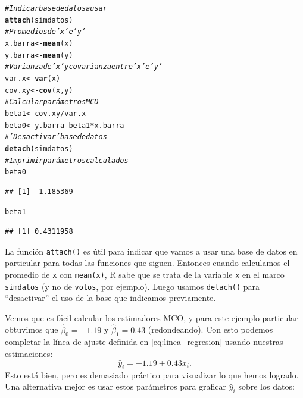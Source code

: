 \documentclass[12pt]{report}\usepackage[]{graphicx}\usepackage[]{color}
\makeatletter
\newcommand{\hlcom}[1]{\textcolor[rgb]{0.678,0.584,0.686}{\textit{#1}}}%
\newcommand{\hlopt}[1]{\textcolor[rgb]{0,0,0}{#1}}%
\newcommand{\hlstd}[1]{\textcolor[rgb]{0.345,0.345,0.345}{#1}}%
\newcommand{\hlkwb}[1]{\textcolor[rgb]{0.69,0.353,0.396}{#1}}%
\newcommand{\hlkwd}[1]{\textcolor[rgb]{0.737,0.353,0.396}{\textbf{#1}}}%
\newenvironment{kframe}{%
 \def\at@end@of@kframe{}%
 \ifinner\ifhmode%
  \def\at@end@of@kframe{\end{minipage}}%
  \begin{minipage}{\columnwidth}%
 \fi\fi%
 \def\FrameCommand##1{\hskip\@totalleftmargin \hskip-\fboxsep
 \colorbox{shadecolor}{##1}\hskip-\fboxsep
     \hskip-\linewidth \hskip-\@totalleftmargin \hskip\columnwidth}%
 \MakeFramed {\advance\hsize-\width
   \@totalleftmargin\z@ \linewidth\hsize
   \@setminipage}}%
 {\par\unskip\endMakeFramed%
 \at@end@of@kframe}
\newenvironment{knitrout}{}{} %
\makeatother
\begin{document}
\begin{knitrout}
\color{fgcolor}\begin{kframe}
\begin{alltt}
\hlcom{# Indicar base de datos a usar}
\hlkwd{attach}\hlstd{(simdatos)}
\hlcom{# Promedios de 'x' e 'y'}
\hlstd{x.barra} \hlkwb{<-} \hlkwd{mean}\hlstd{(x)}
\hlstd{y.barra} \hlkwb{<-} \hlkwd{mean}\hlstd{(y)}
\hlcom{# Varianza de 'x' y covarianza entre 'x' e 'y'}
\hlstd{var.x} \hlkwb{<-} \hlkwd{var}\hlstd{(x)}
\hlstd{cov.xy} \hlkwb{<-} \hlkwd{cov}\hlstd{(x,y)}
\hlcom{# Calcular parámetros MCO}
\hlstd{beta1} \hlkwb{<-} \hlstd{cov.xy}\hlopt{/}\hlstd{var.x}
\hlstd{beta0} \hlkwb{<-} \hlstd{y.barra} \hlopt{-} \hlstd{beta1}\hlopt{*}\hlstd{x.barra}
\hlcom{# 'Desactivar' base de datos}
\hlkwd{detach}\hlstd{(simdatos)}
\hlcom{# Imprimir parámetros calculados}
\hlstd{beta0}
\end{alltt}
\begin{verbatim}
## [1] -1.185369
\end{verbatim}
\begin{alltt}
\hlstd{beta1}
\end{alltt}
\begin{verbatim}
## [1] 0.4311958
\end{verbatim}
\end{kframe}
\end{knitrout}

\begin{Rbox}
La función \verb|attach()| es útil para indicar que vamos a usar una base de datos en particular para todas las funciones que siguen. Entonces cuando calculamos el promedio de \verb|x| con \verb|mean(x)|, R sabe que se trata de la variable \verb|x| en el marco \verb|simdatos| (y no de \verb|votos|, por ejemplo). Luego usamos \verb|detach()| para ``desactivar'' el uso de la base que indicamos previamente.
\end{Rbox}

Vemos que es fácil calcular los estimadores MCO, y para este ejemplo particular obtuvimos que $\hat \beta_0 = -1.19$ y $\hat \beta_1 = 0.43$ (redondeando).
Con esto podemos completar la línea de ajuste definida en \eqref{eq:linea_regresion} usando nuestras estimaciones:
\begin{equation*}
\hat y_i = -1.19 + 0.43x_i.
\end{equation*}
Esto está bien, pero es demasiado práctico para visualizar lo que hemos logrado.
Una alternativa mejor es usar estos parámetros para graficar $\hat y_i$ sobre los datos:
\end{document}
